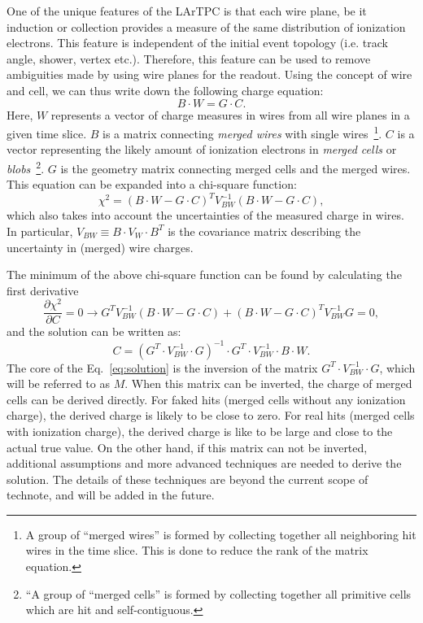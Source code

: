 One of the unique features of the LArTPC is that each wire plane, be it induction or 
collection provides a measure of the same distribution of ionization electrons.
This 
feature is independent of the initial event topology (i.e. track angle, shower, vertex etc.). 
Therefore, this feature can be used to remove ambiguities made by using wire planes for the 
readout. Using the concept of wire and cell, we can thus write down the following charge 
equation:
\begin{equation}\label{eq:charge}
B\cdot W = G\cdot C.
\end{equation}
Here, $W$ represents a vector of charge measures in wires from all wire planes in a given time slice. 
$B$ is a matrix connecting \textit{merged wires} with single wires~\footnote{A group of ``merged wires'' is formed by collecting together all neighboring hit wires in the time slice.  This is done to reduce the rank of the matrix equation.}.
$C$ is a vector representing the likely amount of ionization electrons in \textit{merged cells} or \textit{blobs}~\footnote{``A group of ``merged cells'' is formed by collecting together all primitive cells which are hit and self-contiguous.}.  $G$ is the geometry 
matrix connecting merged cells and the merged wires. This equation can be expanded into 
a chi-square function:
\begin{equation}\label{eq:chi2}
\chi^2 = \left( B\cdot W - G\cdot C \right)^T V_{BW}^{-1} \left(B\cdot W - G\cdot C\right),
\end{equation}
which also takes into account the uncertainties of the measured charge in 
wires. In particular, $V_{BW} \equiv B \cdot V_{W} \cdot B^{T}$ is the 
covariance matrix describing the uncertainty in (merged) wire 
charges. 

The minimum of the above chi-square function can be found by calculating the 
first derivative
\begin{equation}
\frac{\partial \chi^2}{\partial C} = 0  \rightarrow
G^{T} V_{BW}^{-1} \left(B\cdot W - G\cdot C\right) +
\left(B\cdot W- G\cdot C\right)^{T} V_{BW}^{-1} G = 0,
\end{equation}
and the solution can be written as:
\begin{equation}\label{eq:solution}
C = \left( G^{T} \cdot V_{BW}^{-1} \cdot G \right)^{-1} \cdot G^{T} \cdot V_{BW}^{-1} \cdot B\cdot W.
\end{equation}
The core of the Eq.~\eqref{eq:solution} is the inversion of the matrix 
$G^{T} \cdot V_{BW}^{-1} \cdot G$, which will be referred to as $M$. 
When this matrix can be inverted, the charge
of merged cells can be derived directly. For faked hits (merged cells without 
any ionization charge), the derived charge is likely to be close to zero. For 
real hits (merged cells with ionization charge), the derived charge is like to be
large and close to the actual true value. On the other hand, if this matrix can not be
inverted, additional assumptions and more advanced techniques are needed to 
derive the solution. The details of these techniques are beyond the current scope of 
technote, and will be added in the future.



